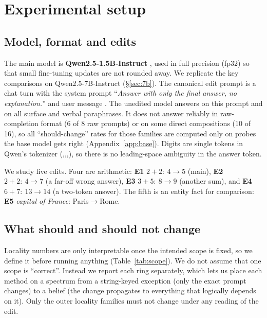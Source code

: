 \section{Experimental setup}
\label{sec:setup}

\subsection{Model, format and edits}
The main model is \textbf{Qwen2.5-1.5B-Instruct} \citep{qwen2025qwen25}, used in full precision (fp32) so that small fine-tuning updates are not rounded away. We replicate the key comparisons on Qwen2.5-7B-Instruct (\S\ref{sec:7b}). The canonical edit prompt is a chat turn with the system prompt ``\emph{Answer with only the final answer, no explanation.}'' and user message . The unedited model answers  on this prompt and on all surface and verbal paraphrases. It does not answer reliably in raw-completion format (6 of 8 raw prompts) or on some direct compositions (10 of 16), so all ``should-change'' rates for those families are computed only on probes the base model gets right (Appendix~\ref{app:base}). Digits are single tokens in Qwen's tokenizer (,\edit{+},,\edit{=}), so there is no leading-space ambiguity in the answer token.

We study five edits. Four are arithmetic: \textbf{E1} $2{+}2{:}\ 4\!\to\!5$ (main), \textbf{E2} $2{+}2{:}\ 4\!\to\!7$ (a far-off wrong answer), \textbf{E3} $3{+}5{:}\ 8\!\to\!9$ (another sum), and \textbf{E4} $6{+}7{:}\ 13\!\to\!14$ (a two-token answer). The fifth is an entity fact for comparison: \textbf{E5} \emph{capital of France}: Paris$\to$Rome.

\subsection{What should and should not change}
\label{sec:scope}
Locality numbers are only interpretable once the intended scope is fixed, so we define it before running anything (Table~\ref{tab:scope}). We do not assume that one scope is ``correct''. Instead we report each ring separately, which lets us place each method on a spectrum from a string-keyed exception (only the exact prompt changes) to a belief (the change propagates to everything that logically depends on it). Only the outer locality families must not change under any reading of the edit.

